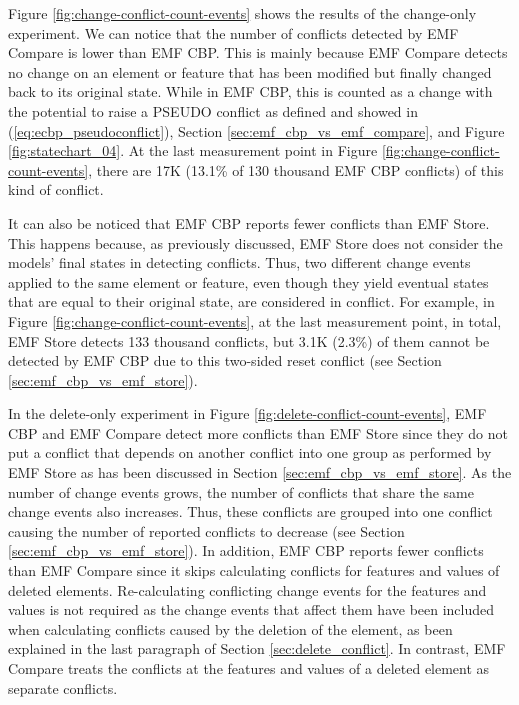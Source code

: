 Figure \ref{fig:change-conflict-count-events} shows the results of the change-only experiment. We can notice that the number of conflicts detected by EMF Compare is lower than EMF CBP. This is mainly because EMF Compare detects no change on an element or feature that has been modified but finally changed back to its original state. While in EMF CBP, this is counted as a change with the potential to raise a {PSEUDO} conflict as defined and showed in (\ref{eq:ecbp_pseudoconflict}), Section \ref{sec:emf_cbp_vs_emf_compare}, and Figure \ref{fig:statechart_04}. At the last measurement point in Figure \ref{fig:change-conflict-count-events}, there are 17K (13.1\% of 130 thousand EMF CBP conflicts) of this kind of conflict. 

It can also be noticed that EMF CBP reports fewer conflicts than EMF Store. This happens because, as previously discussed, EMF Store does not consider the models' final states in detecting conflicts. Thus, two different change events applied to the same element or feature, even though they yield eventual states that are equal to their original state, are considered in conflict. For example, in Figure \ref{fig:change-conflict-count-events}, at the last measurement point, in total, EMF Store detects 133 thousand conflicts, but 3.1K (2.3\%) of them cannot be detected by EMF CBP due to this two-sided reset conflict (see Section \ref{sec:emf_cbp_vs_emf_store}). 

In the delete-only experiment in Figure \ref{fig:delete-conflict-count-events}, EMF CBP and EMF Compare detect more conflicts than EMF Store since they do not put a conflict that depends on another conflict into one group as performed by EMF Store as has been discussed in Section \ref{sec:emf_cbp_vs_emf_store}. As the number of change events grows, the number of conflicts that share the same change events also increases. Thus, these conflicts are grouped into one conflict causing the number of reported conflicts to decrease (see Section \ref{sec:emf_cbp_vs_emf_store}). In addition, EMF CBP reports fewer conflicts than EMF Compare since it skips calculating conflicts for features and values of deleted elements. Re-calculating conflicting change events for the features and values is not required as the change events that affect them have been included when calculating conflicts caused by the deletion of the element, as been explained in the last paragraph of Section \ref{sec:delete_conflict}. In contrast, EMF Compare treats the conflicts at the features and values of a deleted element as separate conflicts. 

